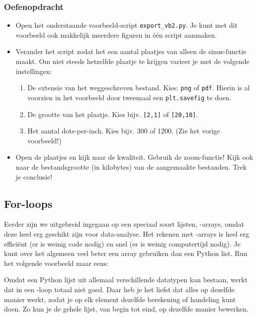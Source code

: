 \documentclass[a4paper,11pt, fleqn]{article}
\begin{document}
\subsubsection*{Oefenopdracht} 
\begin{itemize}
\item Open het onderstaande voorbeeld-script \verb,export_vb2.py,. Je kunt met dit voorbeeld ook makkelijk meerdere figuren in \'e\'en script aanmaken.
\item Verander het script zodat het een aantal plaatjes van alleen de sinus-functie maakt. 
Om niet steeds hetzelfde plaatje te krijgen varieer je met de volgende instellingen:

\begin{enumerate}
\item De extensie van het weggeschreven bestand. Kies: \verb,png, of \verb,pdf,. Hierin is al voorzien in het voorbeeld door tweemaal een \verb,plt.savefig, te doen.
\item De grootte van het plaatje. Kies bijv. \verb=[2,1]= of \verb=[20,10]=.
\item Het aantal dots-per-inch. Kies bijv. 300 of 1200. (Zie het vorige voorbeeld!)
\end{enumerate}

\item Open de plaatjes en kijk naar de kwaliteit. Gebruik de zoom-functie! Kijk ook naar de bestandsgrootte (in kilobytes) van de aangemaakte bestanden. Trek je conclusie!


\end{itemize}

\iffalse
\subsection{For-loops}
\label{Ch_forloop}

Eerder zijn we uitgebreid ingegaan op een speciaal soort lijsten, -arrays, omdat deze heel erg geschikt zijn voor data-analyse. 
Het rekenen met -arrays is heel erg efficiënt (er is weinig code nodig) en snel (er is weinig computertijd nodig). Je kunt over het algemeen veel beter een array gebruiken dan een Python list. Run het volgende voorbeeld maar eens:  


Omdat een Python lijst uit allemaal verschillende datatypen kan bestaan, werkt dat in een -loop totaal niet goed. Daar heb je het liefst dat alles op dezelfde manier werkt, zodat je op elk element dezelfde berekening of handeling kunt doen.
Zo kun je de gehele lijst, van begin tot eind, op dezelfde manier bewerken.
\end{document}

